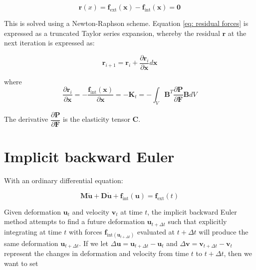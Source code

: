 \begin{equation} \label{eq: residual forces}
\mathbf{r}(x) = \mathbf{f}_\mathrm{ext}(\mathbf{x}) - \mathbf{f}_\mathrm{int}(\mathbf{x}) = \mathbf{0}
\end{equation}

This is solved using a Newton-Raphson scheme.  Equation \ref{eq: residual forces} is expressed as a truncated Taylor series expansion, whereby the residual $ \mathbf{r} $ at the next iteration is expressed as:

\begin{equation}
\mathbf{r}_{i+1} = \mathbf{r}_i + \dfrac{\partial \mathbf{r}_i}{\partial \mathbf{x}} d\mathbf{x}
\end{equation}

where
\begin{equation}
\dfrac{\partial \mathbf{r}_i}{\partial \mathbf{x}} = -\dfrac{\mathbf{f}_\mathrm{int}(\mathbf{x})}{\partial \mathbf{x}} = -\mathbf{K}_t = -\int_{V} \mathbf{B}^T\dfrac{\partial \mathbf{P}}{\partial \mathbf{F}} \mathbf{B} dV
\end{equation}

The derivative $ \dfrac{\partial \mathbf{P}}{\partial \mathbf{F}} $ is the elasticity tensor $ \mathbf{C} $.

\section{Implicit backward Euler} \label{App: implicit backward euler}

With an ordinary differential equation:

\begin{equation}
	\mathbf{M}\ddot{\mathbf{u}}+\mathbf{D}\dot{\mathbf{u}}+\mathbf{f}_{\mathrm{int}}(\mathbf{u})=\mathbf{f}_{\mathrm{ext}}(t)
\end{equation}

Given deformation $ \mathbf{u}_t $ and velocity $ \mathbf{v}_t $ at time $ t $, the implicit backward Euler method attempts to find a future deformation $ \mathbf{u}_{t+\Delta t} $ such that explicitly integrating at time $ t $ with forces $ \mathbf{f}_{\mathrm{int}(\mathbf{u}_{t+\Delta t})} $ evaluated at $ t+\Delta t $ will produce the same deformation $ \mathbf{u}_{t+\Delta t} $. If we let $ \Delta \mathbf{u} = \mathbf{u}_{t+\Delta t}-\mathbf{u}_t $ and $ \Delta \mathbf{v} = \mathbf{v}_{t+\Delta t}-\mathbf{v}_t $ represent the changes in deformation and velocity from time $ t $ to $ t+\Delta t $, then we want to set

